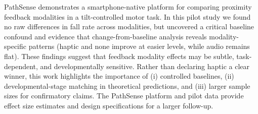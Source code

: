 \documentclass[sigconf]{acmart}
\begin{document}
PathSense demonstrates a smartphone-native platform for comparing proximity feedback modalities in a tilt-controlled motor task.
In this pilot study we found no raw differences in fall rate across modalities, but uncovered a critical baseline confound and evidence that change-from-baseline analysis reveals modality-specific patterns (haptic and none improve at easier levels, while audio remains flat).
These findings suggest that feedback modality effects may be subtle, task-dependent, and developmentally sensitive.
Rather than declaring haptic a clear winner, this work highlights the importance of (i) controlled baselines, (ii) developmental-stage matching in theoretical predictions, and (iii) larger sample sizes for confirmatory claims.
The PathSense platform and pilot data provide effect size estimates and design specifications for a larger follow-up.



\end{document}
